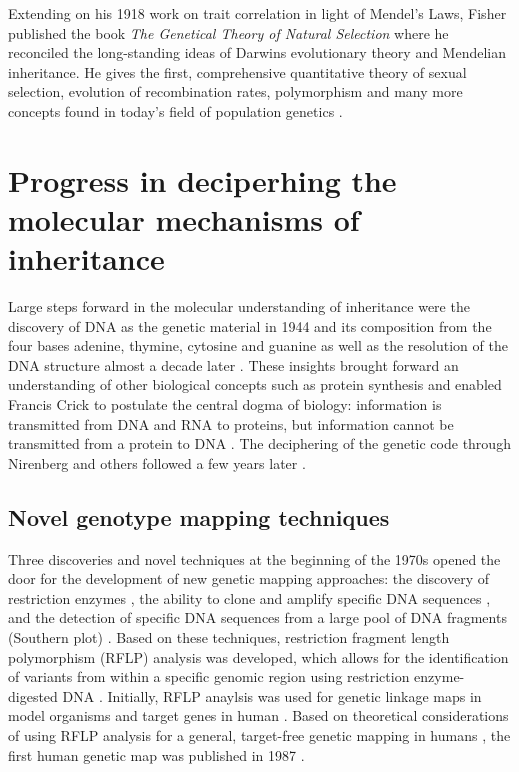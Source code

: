 Extending on his 1918 work on trait correlation in light of Mendel's Laws, Fisher published the book \textit{The Genetical Theory of Natural Selection} where he reconciled the long-standing ideas of Darwins evolutionary theory and Mendelian inheritance. He gives the first, comprehensive quantitative theory of sexual selection, evolution of recombination rates, polymorphism and many more concepts found in today's field of population genetics \citep{Fisher1930}. 

\section{Progress in deciperhing the molecular mechanisms of inheritance}
Large steps forward in the molecular understanding of inheritance were the discovery of DNA as the genetic material in 1944 \citep{Avery1944} and its composition from the four bases adenine, thymine, cytosine and guanine \citep{Vischer1948,Chargaff1949,Chargaff1952} as well as the resolution of the DNA structure almost a decade later \citep{Watson1953}. These insights brought forward an understanding of other biological concepts such as protein synthesis and enabled Francis Crick to postulate the central dogma of biology:  information is transmitted from DNA and RNA to proteins, but information cannot be transmitted from a protein to DNA \citep{Crick1958}. The deciphering of the genetic code through Nirenberg and others followed a few years later \citep{Nirenberg1961,Crick1961,Matthaei1962}.  

\subsection{Novel genotype mapping techniques}
\label{subsection:mapping-techniques}
Three discoveries and novel techniques at the beginning of the 1970s opened the door for the development of new genetic mapping approaches: the discovery of restriction enzymes \citep{Smith1970,Morrow1972}, the ability to clone and amplify specific DNA sequences \citep{Jackson1972,Cohen1973}, and the detection of specific DNA sequences from a large pool of DNA fragments (Southern plot) \citep{Southern1975}. Based on these techniques, restriction fragment length polymorphism (RFLP) analysis was developed, which allows for the identification of variants from within a specific genomic region using restriction enzyme-digested DNA \citep{Grodzicker1974,Botstein1980}. Initially, RFLP anaylsis was used for genetic linkage maps in model organisms \citep{Goodman1977,Cameron1979} and target genes in human  \citep{Kan1978,Jeffreys1979,Tuan1979}.  Based on theoretical considerations of using RFLP analysis for a general, target-free genetic mapping in humans \citep{Botstein1980}, the first human genetic map was published in 1987 \citep{Donis-Keller1987}. 

